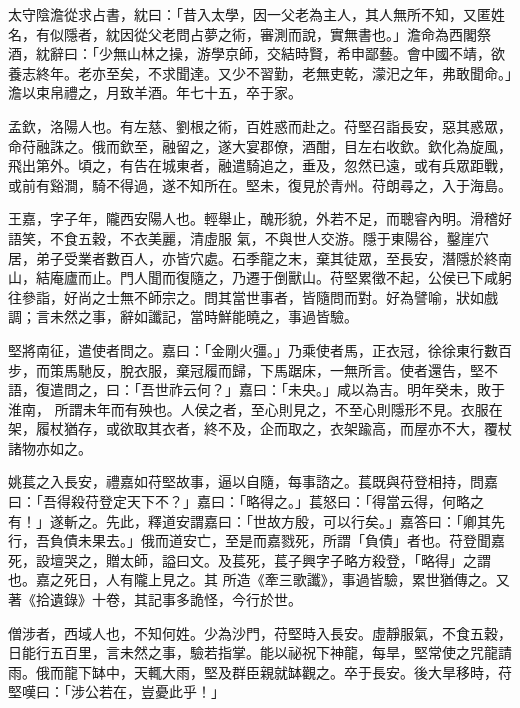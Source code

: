 \begin{pinyinscope}
 太守陰澹從求占書，紞曰：「昔入太學，因一父老為主人，其人無所不知，又匿姓名，有似隱者，紞因從父老問占夢之術，審測而說，實無書也。」澹命為西閣祭酒，紞辭曰：「少無山林之操，游學京師，交結時賢，希申鄙藝。會中國不靖，欲養志終年。老亦至矣，不求聞達。又少不習勤，老無吏乾，濛汜之年，弗敢聞命。」澹以束帛禮之，月致羊酒。年七十五，卒于家。



 孟欽，洛陽人也。有左慈、劉根之術，百姓惑而赴之。苻堅召詣長安，惡其惑眾，命苻融誅之。俄而欽至，融留之，遂大宴郡僚，酒酣，目左右收欽。欽化為旋風，飛出第外。頃之，有告在城東者，融遣騎追之，垂及，忽然已遠，或有兵眾距戰，或前有谿澗，騎不得過，遂不知所在。堅未，復見於青州。苻朗尋之，入于海島。



 王嘉，字子年，隴西安陽人也。輕舉止，醜形貌，外若不足，而聰睿內明。滑稽好語笑，不食五穀，不衣美麗，清虛服
 氣，不與世人交游。隱于東陽谷，鑿崖穴居，弟子受業者數百人，亦皆穴處。石季龍之末，棄其徒眾，至長安，潛隱於終南山，結庵廬而止。門人聞而復隨之，乃遷于倒獸山。苻堅累徵不起，公侯已下咸躬往參詣，好尚之士無不師宗之。問其當世事者，皆隨問而對。好為譬喻，狀如戲調；言未然之事，辭如讖記，當時鮮能曉之，事過皆驗。



 堅將南征，遣使者問之。嘉曰：「金剛火彊。」乃乘使者馬，正衣冠，徐徐東行數百步，而策馬馳反，脫衣服，棄冠履而歸，下馬踞床，一無所言。使者還告，堅不語，復遣問之，曰：「吾世祚云何？」嘉曰：「未央。」咸以為吉。明年癸未，敗于淮南，
 所謂未年而有殃也。人侯之者，至心則見之，不至心則隱形不見。衣服在架，履杖猶存，或欲取其衣者，終不及，企而取之，衣架踰高，而屋亦不大，覆杖諸物亦如之。



 姚萇之入長安，禮嘉如苻堅故事，逼以自隨，每事諮之。萇既與苻登相持，問嘉曰：「吾得殺苻登定天下不？」嘉曰：「略得之。」萇怒曰：「得當云得，何略之有！」遂斬之。先此，釋道安謂嘉曰：「世故方殷，可以行矣。」嘉答曰：「卿其先行，吾負債未果去。」俄而道安亡，至是而嘉戮死，所謂「負債」者也。苻登聞嘉死，設壇哭之，贈太師，謚曰文。及萇死，萇子興字子略方殺登，「略得」之謂也。嘉之死日，人有隴上見之。其
 所造《牽三歌讖》，事過皆驗，累世猶傳之。又著《拾遺錄》十卷，其記事多詭怪，今行於世。



 僧涉者，西域人也，不知何姓。少為沙門，苻堅時入長安。虛靜服氣，不食五穀，日能行五百里，言未然之事，驗若指掌。能以祕祝下神龍，每旱，堅常使之咒龍請雨。俄而龍下缽中，天輒大雨，堅及群臣親就缽觀之。卒于長安。後大旱移時，苻堅嘆曰：「涉公若在，豈憂此乎！」




\end{pinyinscope}
